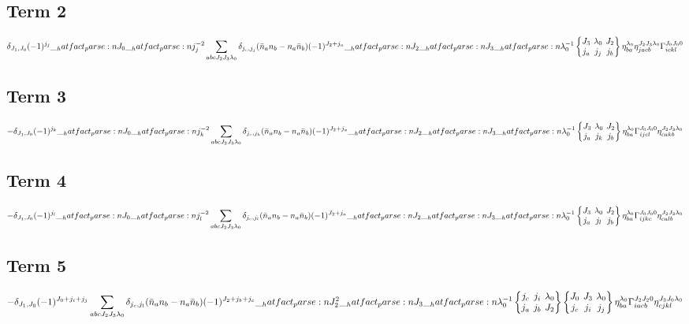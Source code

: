 \documentclass{scrartcl}
\newcommand{\sixj}[6]{\begingroup\setlength{\arraycolsep}{0.2em}\begin{Bmatrix} #1 & #2 & #3 \\ #4 & #5 & #6 \end{Bmatrix}\endgroup}
\begin{document}
\subsection{Term 2}
\begin{dmath*}
\delta_{{J}_{1},{J}_{0}} \* (-1)^{{j}_{j}} \* \hatfact{{J}_{0}} \* \hatfact{{j}_{j}^{-2}} \* \sum_{a b c {J}_{2} {J}_{3} {{\lambda}}_{0}} \* \delta_{{j}_{c},{j}_{j}} \* (\bar{n}_{a} \* n_{b} -n_{a} \* \bar{n}_{b}) \* (-1)^{{J}_{2}+{j}_{a}} \* \hatfact{{J}_{2}} \* \hatfact{{J}_{3}} \* \hatfact{{{\lambda}}_{0}^{-1}} \* \sixj{{J}_{3}}{{{\lambda}}_{0}}{{J}_{2}}{{j}_{a}}{{j}_{j}}{{j}_{b}} \* \eta_{b a}^{{{\lambda}}_{0}} \* \eta_{j a c b}^{{J}_{2} {J}_{3} {{\lambda}}_{0}} \* \Gamma_{i c k l}^{{J}_{0} {J}_{0} 0}
\end{dmath*}
\subsection{Term 3}
\begin{dmath*}
-\delta_{{J}_{1},{J}_{0}} \* (-1)^{{j}_{k}} \* \hatfact{{J}_{0}} \* \hatfact{{j}_{k}^{-2}} \* \sum_{a b c {J}_{2} {J}_{3} {{\lambda}}_{0}} \* \delta_{{j}_{c},{j}_{k}} \* (\bar{n}_{a} \* n_{b} -n_{a} \* \bar{n}_{b}) \* (-1)^{{J}_{2}+{j}_{a}} \* \hatfact{{J}_{2}} \* \hatfact{{J}_{3}} \* \hatfact{{{\lambda}}_{0}^{-1}} \* \sixj{{J}_{3}}{{{\lambda}}_{0}}{{J}_{2}}{{j}_{a}}{{j}_{k}}{{j}_{b}} \* \eta_{b a}^{{{\lambda}}_{0}} \* \Gamma_{i j c l}^{{J}_{0} {J}_{0} 0} \* \eta_{c a k b}^{{J}_{2} {J}_{3} {{\lambda}}_{0}}
\end{dmath*}
\subsection{Term 4}
\begin{dmath*}
-\delta_{{J}_{1},{J}_{0}} \* (-1)^{{j}_{l}} \* \hatfact{{J}_{0}} \* \hatfact{{j}_{l}^{-2}} \* \sum_{a b c {J}_{2} {J}_{3} {{\lambda}}_{0}} \* \delta_{{j}_{c},{j}_{l}} \* (\bar{n}_{a} \* n_{b} -n_{a} \* \bar{n}_{b}) \* (-1)^{{J}_{2}+{j}_{a}} \* \hatfact{{J}_{2}} \* \hatfact{{J}_{3}} \* \hatfact{{{\lambda}}_{0}^{-1}} \* \sixj{{J}_{3}}{{{\lambda}}_{0}}{{J}_{2}}{{j}_{a}}{{j}_{l}}{{j}_{b}} \* \eta_{b a}^{{{\lambda}}_{0}} \* \Gamma_{i j k c}^{{J}_{0} {J}_{0} 0} \* \eta_{c a l b}^{{J}_{2} {J}_{3} {{\lambda}}_{0}}
\end{dmath*}
\subsection{Term 5}
\begin{dmath*}
-\delta_{{J}_{1},{J}_{0}} \* (-1)^{{J}_{0}+{j}_{i}+{j}_{j}} \* \sum_{a b c {J}_{2} {J}_{3} {{\lambda}}_{0}} \* \delta_{{j}_{c},{j}_{l}} \* (\bar{n}_{a} \* n_{b} -n_{a} \* \bar{n}_{b}) \* (-1)^{{J}_{2}+{j}_{b}+{j}_{c}} \* \hatfact{{J}_{2}^{2}} \* \hatfact{{J}_{3}} \* \hatfact{{{\lambda}}_{0}^{-1}} \* \sixj{{j}_{c}}{{j}_{i}}{{{\lambda}}_{0}}{{j}_{a}}{{j}_{b}}{{J}_{2}} \* \sixj{{J}_{0}}{{J}_{3}}{{{\lambda}}_{0}}{{j}_{c}}{{j}_{i}}{{j}_{j}} \* \eta_{b a}^{{{\lambda}}_{0}} \* \Gamma_{i a c b}^{{J}_{2} {J}_{2} 0} \* \eta_{c j k l}^{{J}_{3} {J}_{0} {{\lambda}}_{0}}
\end{dmath*}
\end{document}
